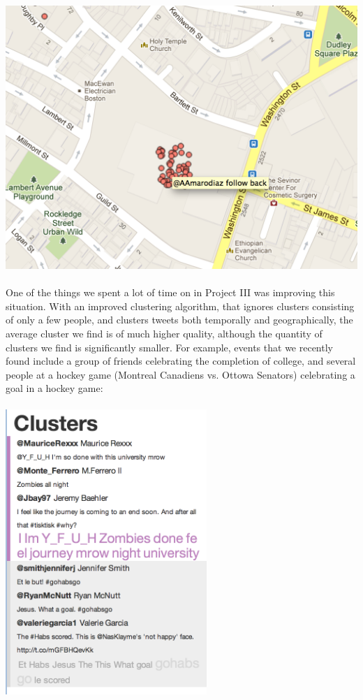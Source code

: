 \documentclass[pdftex,12pt,a4paper]{article}
\begin{document}
\includegraphics[width=5.5in]{lonely.png} \\ \\
One of the things we spent a lot of time on in Project III was improving this situation. With an improved clustering algorithm, that ignores clusters consisting of only a few people, and clusters tweets both temporally and geographically, the average cluster we find is of much higher quality, although the quantity of clusters we find is significantly smaller. For example, events that we recently found include a group of friends celebrating the completion of college, and several people at a hockey game (Montreal Canadiens vs. Ottowa Senators) celebrating a goal in a hockey game: \\ \\
\includegraphics[width=3in]{better2.png} \\ \\
\end{document}

